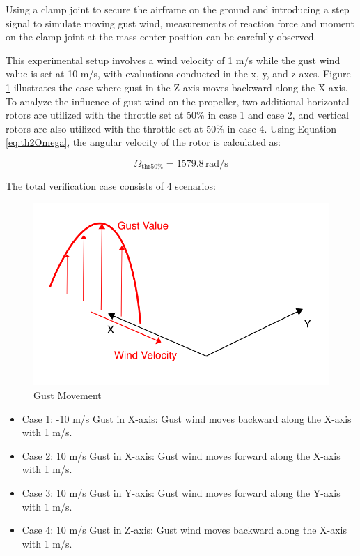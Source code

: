 Using a clamp joint to secure the airframe on the ground and introducing a step signal to simulate moving gust wind, measurements of reaction force and moment on the clamp joint at the mass center position can be carefully observed.

This experimental setup involves a wind velocity of 1 m/s while the gust wind value is set at 10 m/s, with evaluations conducted in the x, y, and z axes. Figure \ref{fig:Gust} illustrates the case where gust in the Z-axis moves backward along the X-axis. To analyze the influence of gust wind on the propeller, two additional horizontal rotors are utilized with the throttle set at 50\% in case 1 and case 2, and vertical rotors are also utilized with the throttle set at 50\% in case 4. Using Equation \ref{eq:th2Omega}, the angular velocity of the rotor is calculated as:

\begin{equation}
    \Omega_{\text{thr50\%}} = 1579.8 \, \text{rad/s}
\end{equation}

The total verification case consists of 4 scenarios:

\begin{figure}[htbp]
    \centering
    \includegraphics[width=0.85\linewidth]{Images/Gust.png}
    \caption{Gust Movement}
    \label{fig:Gust}
\end{figure}

\begin{itemize}
    \item Case 1: -10 m/s Gust in X-axis: Gust wind moves backward along the X-axis with 1 m/s.
    \item Case 2: 10 m/s Gust in X-axis: Gust wind moves forward along the X-axis with 1 m/s.
    \item Case 3: 10 m/s Gust in Y-axis: Gust wind moves forward along the Y-axis with 1 m/s.
    \item Case 4: 10 m/s Gust in Z-axis: Gust wind moves backward along the X-axis with 1 m/s.
\end{itemize}

